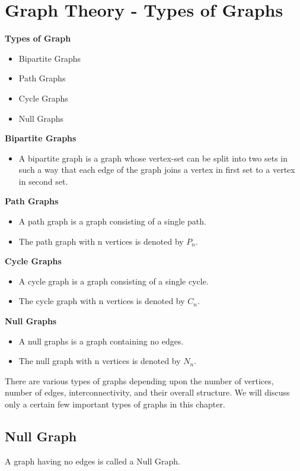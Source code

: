 \section{Graph Theory - Types of Graphs}

\textbf{Types of Graph}
\begin{itemize}
\item Bipartite Graphs
\item Path Graphs
\item Cycle Graphs
\item Null Graphs
\end{itemize}

\textbf{Bipartite Graphs}
\begin{itemize}
\item A bipartite graph is a graph whose vertex-set can be split into two sets in such a way that each edge of the graph joins a vertex in first set to a vertex in second set.
\end{itemize}


\textbf{Path Graphs}
\begin{itemize}
\item A path graph is a graph consisting of a single path. 
\item The path graph with n vertices is denoted by $P_n$.
\end{itemize}


\textbf{Cycle Graphs}
\begin{itemize}
\item A cycle graph is a graph consisting of a single cycle. 
\item The cycle graph with n vertices is denoted by $C_n$.
\end{itemize}


\textbf{Null Graphs}
\begin{itemize}
\item A null graphs is a graph containing no edges. \item The null graph with n vertices is denoted by $N_n$.
\end{itemize}



There are various types of graphs depending upon the number of vertices, number of edges, interconnectivity, and their overall structure. We will discuss only a certain few important types of graphs in this chapter.

\subsection{Null Graph}
A graph having no edges is called a Null Graph.


